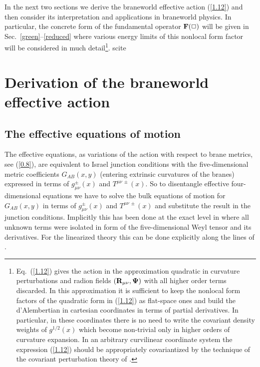 \documentclass[a4paper,preprint,nofootinbib,
                 showpacs,preprintnumbers,amsmath,amssymb]{revtex4}
\begin{document}
In the next two sections we derive the braneworld 
effective action (\ref{1.12}) and then 
consider its interpretation and applications in 
braneworld physics. In particular, the concrete form 
of the fundamental operator ${\bf F}(\Box)$ will be given 
in Sec.~\ref{green}--\ref{reduced} where various energy 
limits of this nonlocal form factor will be considered 
in much detail\footnote{Eq.~(\ref{1.12}) gives the action in the 
approximation quadratic in curvature perturbations and radion 
fields $({\bf R}_{\mu\nu},{\bf\Psi})$ with all higher 
order terms discarded. In this approximation it 
is sufficient to keep the nonlocal form factors of the quadratic 
form in (\ref{1.12}) as flat-space ones and build the 
d'Alembertian in cartesian coordinates in terms of partial 
derivatives. In particular, in these coordinates there is no need 
to write the covariant density weights of $g^{1/2}(x)$ 
which become non-trivial only in higher orders of curvature 
expansion. In an arbitrary curvilinear coordinate system the 
expression (\ref{1.12}) should be appropriately covariantized  
by the technique of the covariant perturbation  
theory of \cite{CPT,CPTIII}.}. 
 scite
\section{Derivation of the braneworld effective action 
\label{der}} 
 
\subsection{The effective equations of motion\label{eom}} 
 
The effective equations, as variations of the 
action with respect to brane metrics, see (\ref{0.8}), are 
equivalent to Israel junction conditions with the five-dimensional 
metric coefficients $G_{AB}(x,y)$ (entering extrinsic curvatures 
of the branes) expressed in terms of $g_{\mu\nu}^\pm(x)$ and 
$T^{\mu\nu\,\pm}(x)$. So to disentangle effective four-dimensional 
equations we have to solve the bulk equations of motion for 
$G_{AB}(x,y)$ in terms of $g_{\mu\nu}^\pm(x)$ and 
$T^{\mu\nu\,\pm}(x)$ and substitute the result in the junction 
conditions. Implicitly this has been done at the exact level in 
\cite{ShiMaSa} where all unknown terms were isolated in form of 
the five-dimensional Weyl tensor and its derivatives. For the 
linearized theory this can be done explicitly along the lines of 
\cite{GT}. 
 
\end{document}
